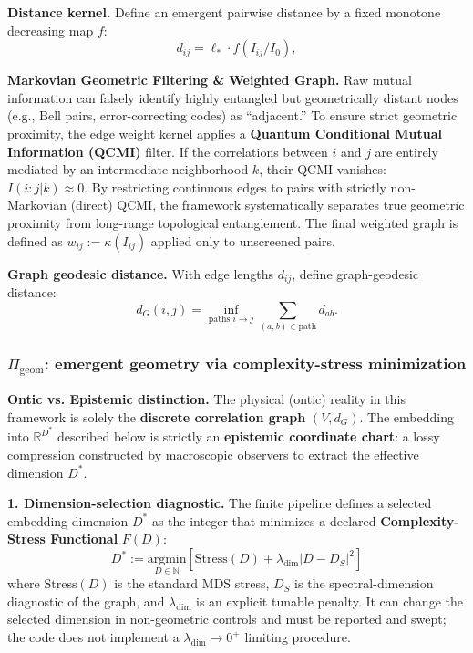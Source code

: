 \documentclass[reprint, amsmath, amssymb, aps, prd]{revtex4-2}
\begin{document}
\textbf{Distance kernel.} Define an emergent pairwise distance by a fixed monotone decreasing map $f$:
\begin{equation}
d_{ij} = \ell_* \cdot f(I_{ij} / I_0),
\end{equation}

\textbf{Markovian Geometric Filtering \& Weighted Graph.} 
Raw mutual information can falsely identify highly entangled but geometrically distant nodes (e.g., Bell pairs, error-correcting codes) as ``adjacent.'' To ensure strict geometric proximity, the edge weight kernel applies a \textbf{Quantum Conditional Mutual Information (QCMI)} filter. If the correlations between $i$ and $j$ are entirely mediated by an intermediate neighborhood $k$, their QCMI vanishes: $I(i:j | k) \approx 0$. By restricting continuous edges to pairs with strictly non-Markovian (direct) QCMI, the framework systematically separates true geometric proximity from long-range topological entanglement. The final weighted graph is defined as $w_{ij} := \kappa(I_{ij})$ applied only to unscreened pairs.

\textbf{Graph geodesic distance.} With edge lengths $d_{ij}$, define graph-geodesic distance:
\begin{equation}
d_G(i,j) = \inf_{\text{paths } i\to j} \sum_{(a,b) \in \text{path}} d_{ab}.
\end{equation}

\subsubsection{\texorpdfstring{$\Pi_{\text{geom}}$}{Pi\_geom}: emergent geometry via complexity-stress minimization}
\label{subsec:pi-geom}
\textbf{Ontic vs. Epistemic distinction.} The physical (ontic) reality in this framework is solely the \textbf{discrete correlation graph} $(V, d_G)$. The embedding into $\mathbb{R}^{D^*}$ described below is strictly an \textbf{epistemic coordinate chart}: a lossy compression constructed by macroscopic observers to extract the effective dimension $D^*$. 

\textbf{1. Dimension-selection diagnostic.} The finite pipeline defines a selected embedding dimension $D^*$ as the integer that minimizes a declared \textbf{Complexity-Stress Functional} $F(D)$:
\begin{equation}
D^* := \underset{D \in \mathbb{N}}{\text{argmin}} \left[ \text{Stress}(D) + \lambda_{\text{dim}} |D - D_S|^2 \right]
\end{equation}
where $\text{Stress}(D)$ is the standard MDS stress, $D_S$ is the spectral-dimension diagnostic of the graph, and $\lambda_{\text{dim}}$ is an explicit tunable penalty. It can change the selected dimension in non-geometric controls and must be reported and swept; the code does not implement a $\lambda_{\text{dim}}\to0^+$ limiting procedure.
\end{document}
